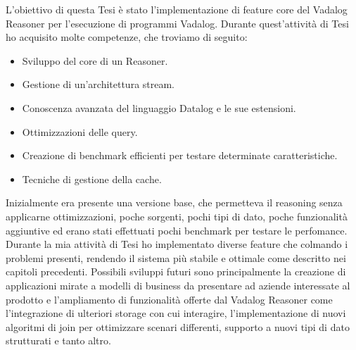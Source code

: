 L'obiettivo di questa Tesi è stato l'implementazione di feature core del Vadalog Reasoner per l'esecuzione di programmi Vadalog. \newline \newline
Durante quest'attività di Tesi ho acquisito molte competenze, che troviamo di seguito:
\begin{itemize}
	\item Sviluppo del core di un Reasoner.
	\item Gestione di un'architettura stream.
	\item Conoscenza avanzata del linguaggio Datalog e le sue estensioni.
	\item Ottimizzazioni delle query.
	\item Creazione di benchmark efficienti per testare determinate caratteristiche.
	\item Tecniche di gestione della cache.
\end{itemize}
Inizialmente era presente una versione base, che permetteva il reasoning senza applicarne ottimizzazioni, poche sorgenti, pochi tipi di dato, poche funzionalità aggiuntive ed erano stati effettuati pochi benchmark per testare le perfomance. \newline
Durante la mia attività di Tesi ho implementato diverse feature che colmando i problemi presenti, rendendo il sistema più stabile e ottimale come descritto nei capitoli precedenti. \newline \newline
Possibili sviluppi futuri sono principalmente la creazione di applicazioni mirate a modelli di business da presentare ad aziende interessate al prodotto e l'ampliamento di funzionalità offerte dal Vadalog Reasoner come l'integrazione di ulteriori storage con cui interagire, l'implementazione di nuovi algoritmi di join per ottimizzare scenari differenti, supporto a nuovi tipi di dato strutturati e tanto altro.